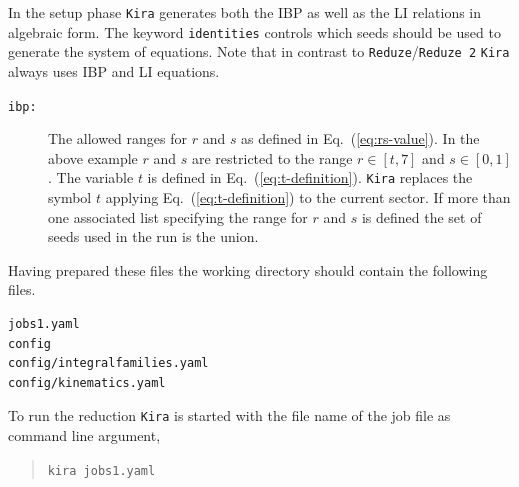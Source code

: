 \documentclass[a4paper,12pt]{scrartcl}
\newcommand*{\kira}{\texttt{Kira}}
\newcommand*{\reduze}{\texttt{Reduze}}
\newcommand*{\reduzetwo}{\texttt{Reduze\,2}}
\def\Eq#1{{Eq.~(\ref{#1})}}
\begin{document}
In the setup phase \kira{} generates both the IBP as well as the LI
relations in algebraic form.
The keyword \texttt{identities} controls which seeds
should be used to generate the system of equations. Note that in
contrast to \reduze{}/\reduzetwo{} \kira{} always uses IBP and LI equations.
\begin{description}
\item[\texttt{ibp:}]
  The allowed ranges for $r$ and $s$ as defined
  in \Eq{eq:rs-value}. In the above
  example $r$ and $s$ are restricted to the range $r\in [t,7]$ and
  $s\in [0,1]$. The variable $t$ is defined in \Eq{eq:t-definition}. \kira{}
  replaces the symbol $t$ applying \Eq{eq:t-definition} to the current
  sector. If more than one associated list specifying the range for
  $r$ and $s$ is defined the set of seeds used in the run is the union.
\end{description}

Having prepared these files the working directory should contain the following files.
\begin{verbatim}
jobs1.yaml
config
config/integralfamilies.yaml
config/kinematics.yaml
\end{verbatim}
To run the reduction \kira{} is started with the file name of the job
file as command line argument,
\begin{verse}
  \texttt{kira jobs1.yaml}
\end{verse}
\end{document}
